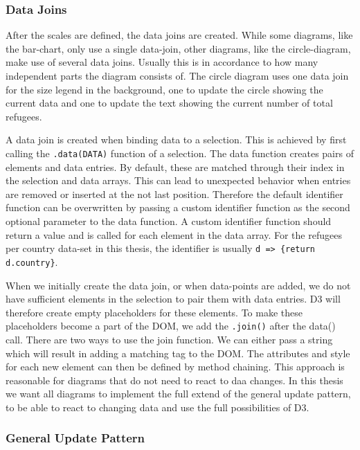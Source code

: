 \subsubsection{Data Joins}
After the scales are defined, the data joins are created. While some diagrams, like the bar-chart, only use a single data-join, other diagrams, like the circle-diagram, make use of several data joins. Usually this is in accordance to how many independent parts the diagram consists of. The circle diagram uses one data join for the size legend in the background, one to update the circle showing the current data and one to update the text showing the current number of total refugees.

A data join is created when binding data to a selection. This is achieved by first calling the \verb|.data(DATA)| function of a selection. The data function creates pairs of elements and data entries. By default, these are matched through their index in the selection and data arrays. This can lead to unexpected behavior when entries are removed or inserted at the not last position. Therefore the default identifier function can be overwritten by passing a custom identifier function as the second optional parameter to the data function. A custom identifier function should return a value and is called for each element in the data array. For the refugees per country data-set in this thesis, the identifier is usually \verb|d => {return d.country}|.

When we initially create the data join, or when data-points are added, we do not have sufficient elements in the selection to pair them with data entries. D3 will therefore create empty placeholders for these elements. To make these placeholders become a part of the DOM, we add the \verb|.join()| after the data() call. There are two ways to use the join function. We can either pass a string which will result in adding a matching tag to the DOM. The attributes and style for each new element can then be defined by method chaining. This approach is reasonable for diagrams that do not need to react to daa changes. In this thesis we want all diagrams to implement the full extend of the general update pattern, to be able to react to changing data and use the full possibilities of D3.

\subsubsection{General Update Pattern}


